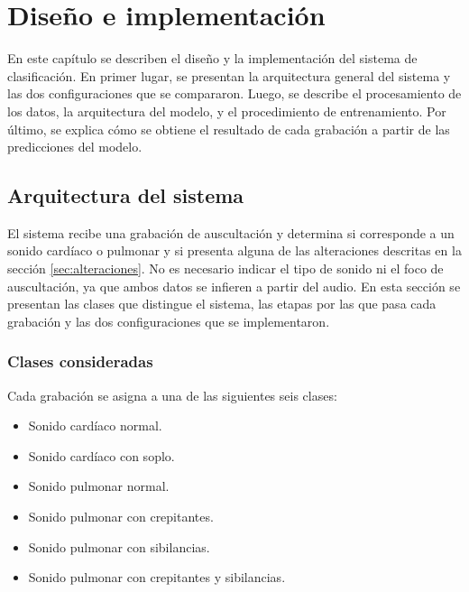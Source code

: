 \chapter{Diseño e implementación} %

\label{Chapter3}

En este capítulo se describen el diseño y la implementación del sistema de clasificación. En primer
lugar, se presentan la arquitectura general del sistema y las dos configuraciones que se
compararon. Luego, se describe el procesamiento de los datos, la arquitectura del modelo, y
el procedimiento de entrenamiento. Por último, se explica cómo se obtiene el resultado de cada
grabación a partir de las predicciones del modelo.


\section{Arquitectura del sistema}
\label{sec:arquitectura}

El sistema recibe una grabación de auscultación y determina si corresponde a un sonido cardíaco o
pulmonar y si presenta alguna de las alteraciones descritas en la sección \ref{sec:alteraciones}.
No es necesario indicar el tipo de sonido ni el foco de auscultación, ya que ambos datos se
infieren a partir del audio. En esta sección se presentan las clases que distingue el sistema, las
etapas por las que pasa cada grabación y las dos configuraciones que se implementaron.

\subsection{Clases consideradas}
\label{subsec:clases}

Cada grabación se asigna a una de las siguientes seis clases:

\begin{itemize}
	\item Sonido cardíaco normal.
	\item Sonido cardíaco con soplo.
	\item Sonido pulmonar normal.
	\item Sonido pulmonar con crepitantes.
	\item Sonido pulmonar con sibilancias.
	\item Sonido pulmonar con crepitantes y sibilancias.
\end{itemize}

